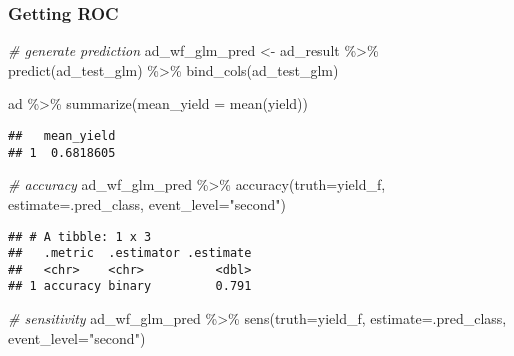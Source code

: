 \documentclass[
]{article}
\newenvironment{Shaded}{\begin{snugshade}}{\end{snugshade}}
\newcommand{\AttributeTok}[1]{\textcolor[rgb]{0.77,0.63,0.00}{#1}}
\newcommand{\CommentTok}[1]{\textcolor[rgb]{0.56,0.35,0.01}{\textit{#1}}}
\newcommand{\FunctionTok}[1]{\textcolor[rgb]{0.00,0.00,0.00}{#1}}
\newcommand{\NormalTok}[1]{#1}
\newcommand{\OtherTok}[1]{\textcolor[rgb]{0.56,0.35,0.01}{#1}}
\newcommand{\SpecialCharTok}[1]{\textcolor[rgb]{0.00,0.00,0.00}{#1}}
\newcommand{\StringTok}[1]{\textcolor[rgb]{0.31,0.60,0.02}{#1}}
\begin{document}
\hypertarget{getting-roc}{%
\subsubsection{Getting ROC}\label{getting-roc}}

\begin{Shaded}
\begin{Highlighting}[]
\CommentTok{\# generate prediction}
\NormalTok{ad\_wf\_glm\_pred }\OtherTok{\textless{}{-}}\NormalTok{ ad\_result }\SpecialCharTok{\%\textgreater{}\%}
  \FunctionTok{predict}\NormalTok{(ad\_test\_glm) }\SpecialCharTok{\%\textgreater{}\%}
  \FunctionTok{bind\_cols}\NormalTok{(ad\_test\_glm)}
\end{Highlighting}
\end{Shaded}

\begin{Shaded}
\begin{Highlighting}[]
\NormalTok{ad }\SpecialCharTok{\%\textgreater{}\%} 
  \FunctionTok{summarize}\NormalTok{(}\AttributeTok{mean\_yield =} \FunctionTok{mean}\NormalTok{(yield))}
\end{Highlighting}
\end{Shaded}

\begin{verbatim}
##   mean_yield
## 1  0.6818605
\end{verbatim}

\begin{Shaded}
\begin{Highlighting}[]
\CommentTok{\# accuracy}
\NormalTok{ad\_wf\_glm\_pred }\SpecialCharTok{\%\textgreater{}\%}
  \FunctionTok{accuracy}\NormalTok{(}\AttributeTok{truth=}\NormalTok{yield\_f, }\AttributeTok{estimate=}\NormalTok{.pred\_class, }\AttributeTok{event\_level=}\StringTok{"second"}\NormalTok{)}
\end{Highlighting}
\end{Shaded}

\begin{verbatim}
## # A tibble: 1 x 3
##   .metric  .estimator .estimate
##   <chr>    <chr>          <dbl>
## 1 accuracy binary         0.791
\end{verbatim}

\begin{Shaded}
\begin{Highlighting}[]
\CommentTok{\# sensitivity}
\NormalTok{ad\_wf\_glm\_pred }\SpecialCharTok{\%\textgreater{}\%}
  \FunctionTok{sens}\NormalTok{(}\AttributeTok{truth=}\NormalTok{yield\_f, }\AttributeTok{estimate=}\NormalTok{.pred\_class, }\AttributeTok{event\_level=}\StringTok{"second"}\NormalTok{)}
\end{Highlighting}
\end{Shaded}
\end{document}
